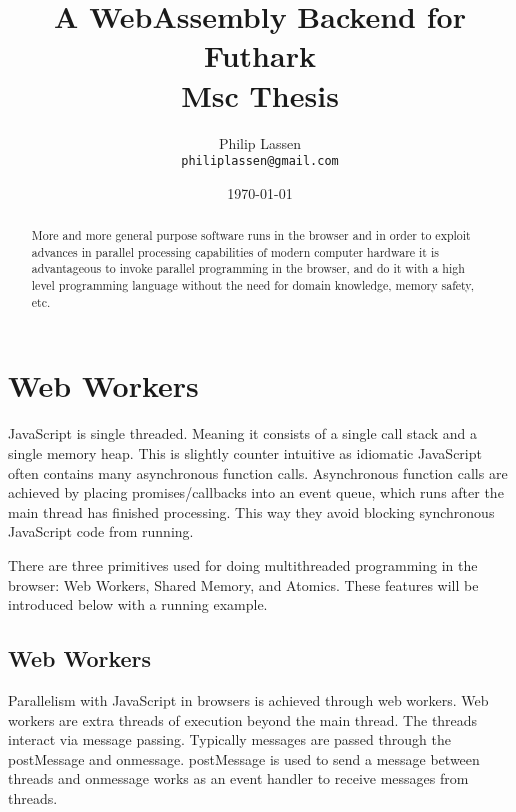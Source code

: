 \documentclass[11pt]{article}
\title{
  \vspace{3cm}
  \Huge{A WebAssembly Backend for Futhark} \\
  \Large{Msc Thesis}
}
\author{
  \Large{Philip Lassen}
  \\ \texttt{philiplassen@gmail.com} \\
}
\date{
    \today
}
\def \ColourPDF {include/natbio-farve}
\def \TitlePDF   {include/nat-en}  %
\begin{document}


\clearpage\maketitle
\thispagestyle{empty}

\newpage


\begin{abstract}
More and more general purpose software runs in the browser and in order to exploit advances in parallel processing capabilities of modern computer hardware it is advantageous to invoke parallel programming in the browser, and do it with a high level programming language without the need for domain knowledge, memory safety, etc.
\end{abstract}


\newpage
\tableofcontents
\newpage



\newpage





\section{Web Workers}



JavaScript is single threaded. Meaning it consists of a single call stack and a single memory heap. This is slightly counter intuitive as idiomatic JavaScript often contains many asynchronous function calls. Asynchronous function calls are achieved by placing promises/callbacks into an event queue, which runs after the main thread has finished processing. This way they avoid blocking synchronous JavaScript code from running. 

There are three primitives used for doing multithreaded programming in the browser: Web Workers, Shared Memory, and Atomics. These features will be introduced below with a running example. 


\subsection{Web Workers}
Parallelism with JavaScript in browsers is achieved through web workers. Web workers are extra threads of execution beyond the main thread. The threads interact via message passing. Typically messages are passed through the postMessage and onmessage. postMessage is used to send a message between threads and onmessage works as an event handler to receive messages from threads. 
\end{document}
